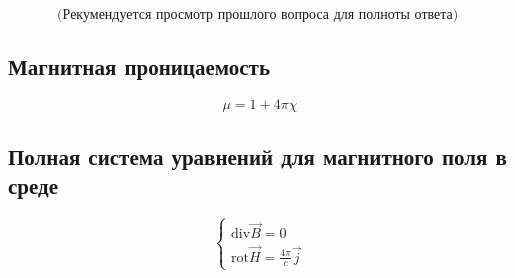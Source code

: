 \[
\text{(Рекумендуется просмотр прошлого вопроса для полноты ответа) }
\]

\subsection*{Магнитная проницаемость}

\[
\mu=1+4\pi\chi
\]

\subsection*{Полная система уравнений для
магнитного поля в среде}

\[
    \begin{cases}
        \mathrm{div}\vec{B}=0 \\
        \mathrm{rot}\vec{H}= \frac{4\pi}{c}\vec{j}
    \end{cases}
\]
 
